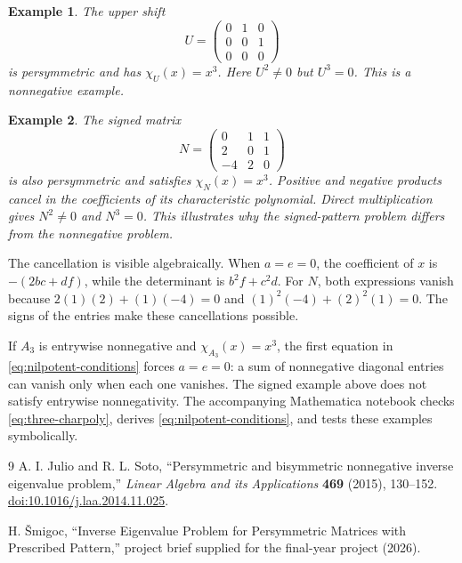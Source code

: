 \documentclass[11pt,a4paper]{article}
\newtheorem{example}{Example}
\begin{document}
\begin{example}
The upper shift
\[
 U=\begin{pmatrix}0&1&0\\0&0&1\\0&0&0\end{pmatrix}
\]
is persymmetric and has $\chi_U(x)=x^3$. Here $U^2\ne0$ but $U^3=0$.
This is a nonnegative example.
\end{example}

\begin{example}
The signed matrix
\[
 N=\begin{pmatrix}0&1&1\\2&0&1\\-4&2&0\end{pmatrix}
\]
is also persymmetric and satisfies $\chi_N(x)=x^3$. Positive and negative
products cancel in the coefficients of its characteristic polynomial.
Direct multiplication gives $N^2\ne0$ and
$N^3=0$. This illustrates why the signed-pattern problem differs from the
nonnegative problem.
\end{example}

The cancellation is visible algebraically. When $a=e=0$, the coefficient of
$x$ is $-(2bc+df)$, while the determinant is $b^2f+c^2d$. For $N$, both
expressions vanish because $2(1)(2)+(1)(-4)=0$ and
$(1)^2(-4)+(2)^2(1)=0$. The signs of the entries make these cancellations
possible.

If $A_3$ is entrywise nonnegative and $\chi_{A_3}(x)=x^3$, the first equation
in \eqref{eq:nilpotent-conditions} forces $a=e=0$: a sum of nonnegative
diagonal entries can vanish only when each one vanishes. The signed example
above does not satisfy entrywise nonnegativity. The accompanying Mathematica
notebook checks \eqref{eq:three-charpoly}, derives
\eqref{eq:nilpotent-conditions}, and tests these examples symbolically.

\begin{thebibliography}{9}
A. I. Julio and R. L. Soto,
``Persymmetric and bisymmetric nonnegative inverse eigenvalue problem,''
\emph{Linear Algebra and its Applications} \textbf{469} (2015), 130--152.
\href{https://doi.org/10.1016/j.laa.2014.11.025}{doi:10.1016/j.laa.2014.11.025}.

H. \v{S}migoc,
``Inverse Eigenvalue Problem for Persymmetric Matrices with Prescribed Pattern,''
project brief supplied for the final-year project (2026).
\end{thebibliography}
\end{document}
